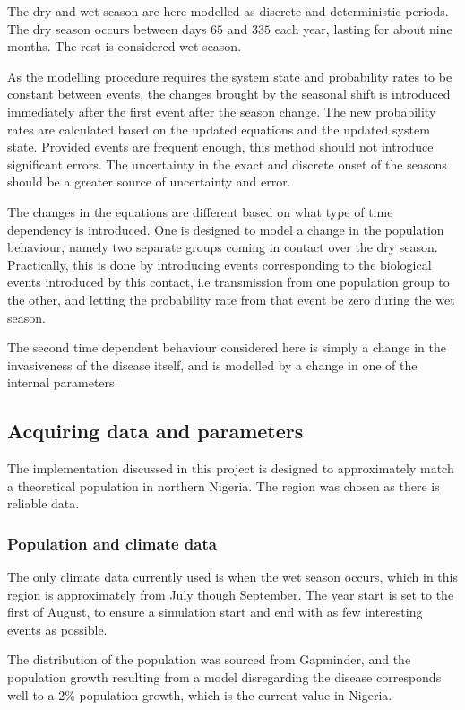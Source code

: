 \documentclass[10pt,a4paper]{article}
\begin{document}
The dry and wet season are here modelled as discrete and deterministic periods. The dry season occurs between days $65$ and $335$ each year, lasting for about nine months. The rest is considered wet season.

As the modelling procedure requires the system state and probability rates to be constant between events, the changes brought by the seasonal shift is introduced immediately after the first event after the season change. The new probability rates are calculated based on the updated equations and the updated system state. Provided events are frequent enough, this method should not introduce significant errors. The uncertainty in the exact and discrete onset of the seasons should be a greater source of uncertainty and error.

The changes in the equations are different based on what type of time dependency is introduced. One is designed to model a change in the population behaviour, namely two separate groups coming in contact over the dry season. Practically, this is done by introducing events corresponding to the biological events introduced by this contact, i.e transmission from one population group to the other, and letting the probability rate from that event be zero during the wet season.

The second time dependent behaviour considered here is simply a change in the invasiveness of the disease itself, and is modelled by a change in one of the internal parameters.

\subsection{Acquiring data and parameters}

The implementation discussed in this project is designed to approximately match a theoretical population in northern Nigeria. The region was chosen as there is reliable data.

\subsubsection{Population and climate data}

The only climate data currently used is when the wet season occurs, which in this region is approximately from July though September. The year start is set to the first of August, to ensure a simulation start and end with as few interesting events as possible.

The distribution of the population was sourced from Gapminder, and the population growth resulting from a model disregarding the disease corresponds well to a 2\% population growth, which is the current value in Nigeria.
\end{document}
